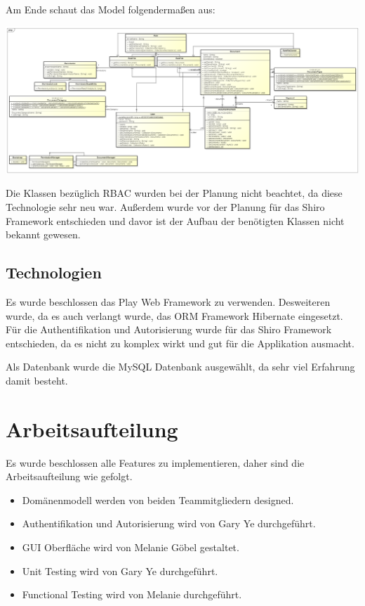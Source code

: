 \documentclass[11pt, a4paper]{article}
\begin{document}
Am Ende schaut das Model folgendermaßen aus:

\includegraphics[width=\textwidth]{pic/dms-end}

Die Klassen bezüglich RBAC wurden bei der Planung nicht beachtet, da diese Technologie sehr neu war. Außerdem wurde vor der Planung für das Shiro Framework entschieden und davor ist der Aufbau der benötigten Klassen nicht bekannt gewesen.

\subsection{Technologien}

Es wurde beschlossen das Play Web Framework zu verwenden. Desweiteren wurde, da es auch verlangt wurde, das ORM Framework Hibernate eingesetzt. Für die Authentifikation und Autorisierung wurde für das Shiro Framework entschieden, da es nicht zu komplex wirkt und gut für die Applikation ausmacht. 

Als Datenbank wurde die MySQL Datenbank ausgewählt, da sehr viel Erfahrung damit besteht.

\section{Arbeitsaufteilung}

Es wurde beschlossen alle Features zu implementieren, daher sind die Arbeitsaufteilung wie gefolgt. 

\begin{itemize}
  \item Domänenmodell werden von beiden Teammitgliedern designed.
  \item Authentifikation und Autorisierung wird von Gary Ye durchgeführt.
  \item GUI Oberfläche wird von Melanie Göbel gestaltet.
  \item Unit Testing wird von Gary Ye durchgeführt.
  \item Functional Testing wird von Melanie durchgeführt.
\end{itemize}
\end{document}
